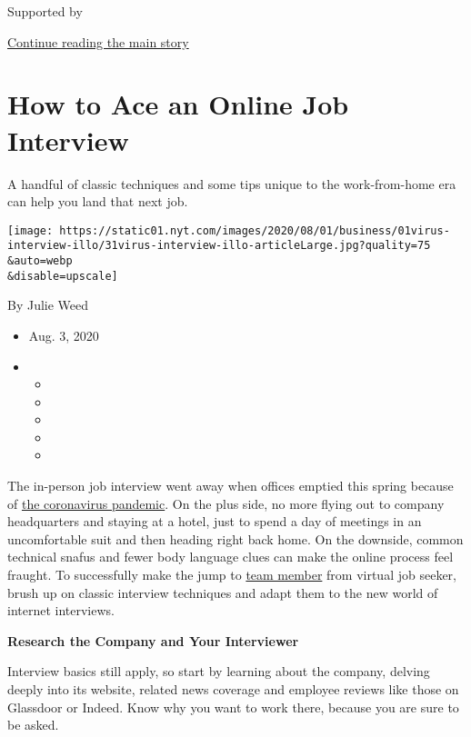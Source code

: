 Supported by

\protect\hyperlink{after-sponsor}{Continue reading the main story}

\hypertarget{how-to-ace-an-online-job-interview}{%
\section{How to Ace an Online Job
Interview}\label{how-to-ace-an-online-job-interview}}

A handful of classic techniques and some tips unique to the
work-from-home era can help you land that next job.

\texttt{[image: https://static01.nyt.com/images/2020/08/01/business/01virus-interview-illo/31virus-interview-illo-articleLarge.jpg?quality=75\\\&auto=webp\\\&disable=upscale]}

By Julie Weed

\begin{itemize}
\item
  Aug. 3, 2020
\item
  \begin{itemize}
  \item
  \item
  \item
  \item
  \item
  \end{itemize}
\end{itemize}

The in-person job interview went away when offices emptied this spring
because of \href{https://www.nytimes.com/news-event/coronavirus}{the
coronavirus pandemic}. On the plus side, no more flying out to company
headquarters and staying at a hotel, just to spend a day of meetings in
an uncomfortable suit and then heading right back home. On the downside,
common technical snafus and fewer body language clues can make the
online process feel fraught. To successfully make the jump to
\href{https://www.nytimes.com/2020/06/21/business/work-home-coronavirus.html}{team
member} from virtual job seeker, brush up on classic interview
techniques and adapt them to the new world of internet interviews.

\textbf{Research the Company and Your Interviewer}

Interview basics still apply, so start by learning about the company,
delving deeply into its website, related news coverage and employee
reviews like those on Glassdoor or Indeed. Know why you want to work
there, because you are sure to be asked.

